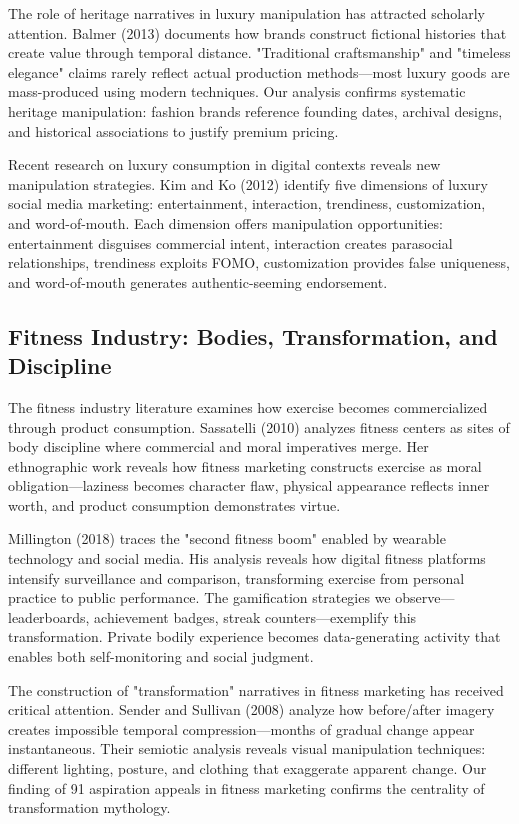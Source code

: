 The role of heritage narratives in luxury manipulation has attracted scholarly attention. Balmer (2013) documents how brands construct fictional histories that create value through temporal distance. "Traditional craftsmanship" and "timeless elegance" claims rarely reflect actual production methods—most luxury goods are mass-produced using modern techniques. Our analysis confirms systematic heritage manipulation: fashion brands reference founding dates, archival designs, and historical associations to justify premium pricing.

Recent research on luxury consumption in digital contexts reveals new manipulation strategies. Kim and Ko (2012) identify five dimensions of luxury social media marketing: entertainment, interaction, trendiness, customization, and word-of-mouth. Each dimension offers manipulation opportunities: entertainment disguises commercial intent, interaction creates parasocial relationships, trendiness exploits FOMO, customization provides false uniqueness, and word-of-mouth generates authentic-seeming endorsement.

\subsection{Fitness Industry: Bodies, Transformation, and Discipline}

The fitness industry literature examines how exercise becomes commercialized through product consumption. Sassatelli (2010) analyzes fitness centers as sites of body discipline where commercial and moral imperatives merge. Her ethnographic work reveals how fitness marketing constructs exercise as moral obligation—laziness becomes character flaw, physical appearance reflects inner worth, and product consumption demonstrates virtue.

Millington (2018) traces the "second fitness boom" enabled by wearable technology and social media. His analysis reveals how digital fitness platforms intensify surveillance and comparison, transforming exercise from personal practice to public performance. The gamification strategies we observe—leaderboards, achievement badges, streak counters—exemplify this transformation. Private bodily experience becomes data-generating activity that enables both self-monitoring and social judgment.

The construction of "transformation" narratives in fitness marketing has received critical attention. Sender and Sullivan (2008) analyze how before/after imagery creates impossible temporal compression—months of gradual change appear instantaneous. Their semiotic analysis reveals visual manipulation techniques: different lighting, posture, and clothing that exaggerate apparent change. Our finding of 91 aspiration appeals in fitness marketing confirms the centrality of transformation mythology.

